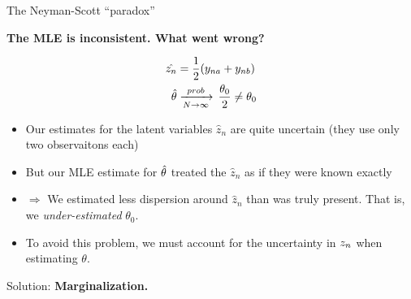 
\begin{frame}{The Neyman-Scott ``paradox''}

\textbf{The MLE is inconsistent.  What went wrong?}

\begin{align*}
\hat{z_n} &= \frac{1}{2}(y_{na} + y_{nb}) \\
\hat\theta &\xrightarrow[N\rightarrow\infty]{prob}\, \frac{\theta_0}{2} \ne \theta_0
\end{align*}

\begin{itemize}
\item Our estimates for the latent variables $\hat{z}_n$ are quite uncertain (they use only
two observaitons each)
%
\item But our MLE estimate for $\hat\theta$ treated the $\hat{z}_n$ as if they
were known exactly
%
\item $\Rightarrow$ We estimated less dispersion around $\hat{z}_n$ than was
truly present.  That is, we \emph{under-estimated} $\theta_0$.
%
\item To avoid this problem, we must account for the uncertainty in $z_n$
when estimating $\theta$.
%
\end{itemize}

Solution: \textbf{Marginalization.}

\end{frame}
